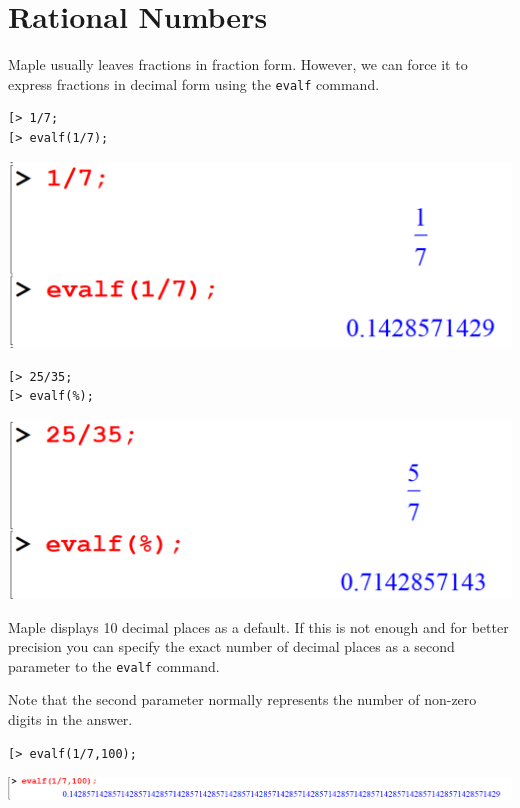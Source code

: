 \documentclass[
]{book}
\theoremstyle{definition}
\theoremstyle{definition}
\theoremstyle{definition}
\theoremstyle{definition}
\theoremstyle{remark}
\begin{document}
\section{Rational Numbers}\label{rational-numbers-1}

Maple usually leaves fractions in fraction form. However, we can force it to express fractions in decimal form using the \texttt{evalf} command.

\begin{verbatim}
[> 1/7;
[> evalf(1/7);
\end{verbatim}

\includegraphics{figures/Lesson 1/fig34.png}

\begin{verbatim}
[> 25/35;
[> evalf(%);
\end{verbatim}

\includegraphics{figures/Lesson 1/fig35.png}

Maple displays 10 decimal places as a default. If this is not enough and for better precision you can specify the exact number of decimal places as a second parameter to the \texttt{evalf} command.

Note that the second parameter normally represents the number of non-zero digits in the answer.

\begin{verbatim}
[> evalf(1/7,100);
\end{verbatim}

\includegraphics{figures/Lesson 1/fig36.png}
\end{document}
